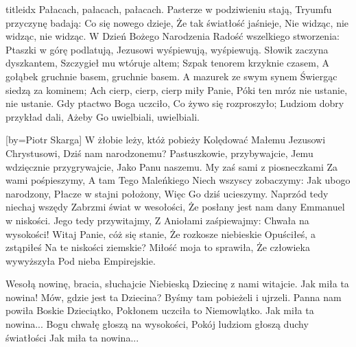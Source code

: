 \documentclass[a5paper, portrait, 12pt]{mwart}
\begin{document}
\begin{songs}{titleidx}
    Pałacach, pałacach, pałacach.
\endchorus
\beginverse
    Pasterze w podziwieniu stają,
    Tryumfu przyczynę badają:
\endverse
\beginchorus
    Co się nowego dzieje,
    Że tak światłość jaśnieje,
    Nie widząc, nie widząc, nie widząc. 
\endchorus
\endsong
\beginverse
    W Dzień Bożego Narodzenia
    Radość wszelkiego stworzenia:
    Ptaszki w górę podlatują,
    Jezusowi wyśpiewują, wyśpiewują.
\endverse
\beginverse
    Słowik zaczyna dyszkantem,
    Szczygieł mu wtóruje altem;
    Szpak tenorem krzyknie czasem,
    A gołąbek gruchnie basem, gruchnie basem.
\endverse
\beginverse
    A mazurek ze swym synem
    Świergąc siedzą za kominem;
    Ach cierp, cierp, cierp miły Panie,
    Póki ten mróz nie ustanie, nie ustanie.
\endverse
\beginverse
    Gdy ptactwo Boga uczciło,
    Co żywo się rozproszyło;
    Ludziom dobry przykład dali,
    Ażeby Go uwielbiali, uwielbiali.
\endverse
\endsong

[by={Piotr Skarga}]
\beginverse
    W żłobie leży, któż pobieży
    Kolędować Małemu
    Jezusowi Chrystusowi,
    Dziś nam narodzonemu?
\endverse
\beginchorus
        Pastuszkowie, przybywajcie,
        Jemu wdzięcznie przygrywajcie,
        Jako Panu naszemu.
\endchorus
\beginverse
    My zaś sami z piosneczkami
    Za wami pośpieszymy,
    A tam Tego Maleńkiego
    Niech wszyscy zobaczymy:
\endverse
\beginchorus
        Jak ubogo narodzony,
        Płacze w stajni położony,
        Więc Go dziś ucieszymy.
\endchorus
\beginverse
    Naprzód tedy niechaj wszędy
    Zabrzmi świat w wesołości,
    Że posłany jest nam dany
    Emmanuel w niskości.
\endverse
\beginchorus
        Jego tedy przywitajmy,
        Z Aniołami zaśpiewajmy:
        Chwała na wysokości!
\endchorus
\beginverse
    Witaj Panie, cóż się stanie,
    Że rozkosze niebieskie
    Opuściłeś, a zstąpiłeś
    Na te niskości ziemskie?
\endverse
\beginchorus
        Miłość moja to sprawiła,
        Że człowieka wywyższyła
        Pod nieba Empirejskie.
\endchorus
\endsong

\beginverse
    Wesołą nowinę, bracia, słuchajcie
    Niebieską Dziecinę z nami witajcie.
\endverse
\beginchorus
        Jak miła ta nowina!
        Mów, gdzie jest ta Dziecina?
        Byśmy tam pobieżeli i ujrzeli.
\endchorus
\beginverse
    Panna nam powiła Boskie Dzieciątko,
    Pokłonem uczciła to Niemowlątko.
\endverse
\beginchorus
        Jak miła ta nowina...
\endchorus
\beginverse
    Bogu chwałę głoszą na wysokości,
    Pokój ludziom głoszą duchy światłości
\endverse
\beginchorus
        Jak miła ta nowina...
\endchorus


\end{songs}
\end{document}
